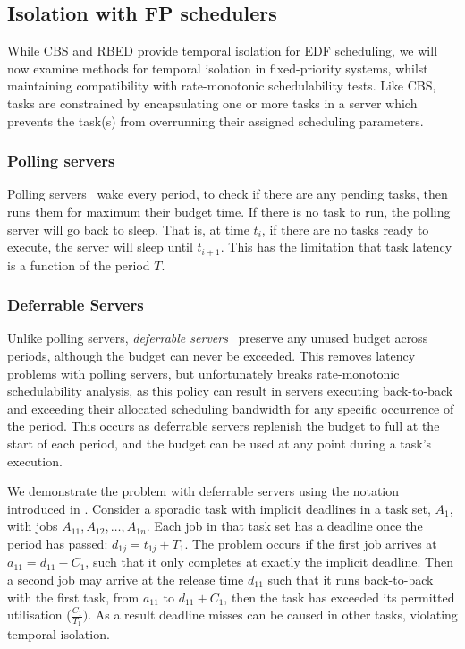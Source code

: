\subsection{Isolation with FP schedulers}
\label{background:fp-isolation}

While \gls{CBS} and \gls{RBED} provide temporal isolation for \gls{EDF} scheduling, we will now
examine methods for temporal isolation in fixed-priority systems, whilst maintaining compatibility
with rate-monotonic schedulability tests.  Like \gls{CBS}, tasks are constrained by encapsulating
one or more tasks in a server which prevents the task(s) from overrunning their assigned scheduling
parameters.

\subsubsection{Polling servers}
\label{p:polling-servers}

Polling servers~\citep{Lehoczky_LS_87} wake every period,
to check if there are any pending tasks, then runs them for maximum their budget time. If there is no
task to run, the polling server will go back to sleep. That is, at time $t_{i}$, if there are no
tasks ready to execute, the server will sleep until $t_{i+1}$. This has the limitation that task latency
is a function of the period $T$.

\subsubsection{Deferrable Servers}
\label{p:ds} 

Unlike polling servers, \emph{deferrable
servers}~\citep{Lehoczky_LS_87, Strosnider_LS_95} preserve any unused budget across periods, although
the budget can never be exceeded.  This removes latency problems with polling servers, but
unfortunately breaks rate-monotonic schedulability analysis, as this policy can result in servers
executing back-to-back and exceeding their allocated scheduling bandwidth for any specific occurrence of
the period.  This occurs as deferrable servers replenish the budget to full at the start of each
period, and the budget can be used at any point during a task's execution. 

We demonstrate the problem with deferrable servers using the notation introduced in
. Consider a sporadic task with implicit deadlines in a task set, 
$A_{1}$, with jobs $A_{11}, A_{12}, \ldots, A_{1n}$. Each job in that task set has a deadline once the
period has passed: $d_{1j} = t_{1j} + T_{1}$. The problem occurs if the first job arrives at $a_{11}
= d_{11}-C_{1}$, such that it only completes at exactly the implicit deadline.  
Then a second job may arrive at the release time $d_{11}$ such that it runs back-to-back with the first
task, from $a_11$ to $d_{11} + C_{1}$, then the task has exceeded its permitted utilisation 
($\frac{C_{1}}{T_{1}})$. As a result deadline misses can be caused in other
tasks, violating temporal isolation.

